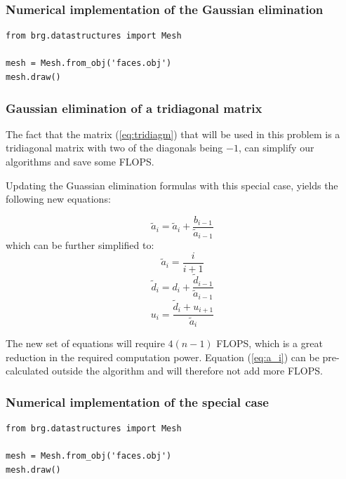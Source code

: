 \documentclass[12pt]{article}
\begin{document}
\subsubsection{Numerical implementation of the Gaussian elimination}

\lstset{language=Python}
\lstset{frame=lines}
\lstset{basicstyle=\footnotesize}
\begin{lstlisting}
from brg.datastructures import Mesh
 
mesh = Mesh.from_obj('faces.obj')
mesh.draw()
\end{lstlisting}

\subsubsection{Gaussian elimination of a tridiagonal matrix}
The fact that the matrix (\ref{eq:tridiagm}) that will be used in this problem is a tridiagonal matrix with two of the diagonals being $-1$, can simplify our algorithms and save some FLOPS.

Updating the Guassian elimination formulas with this special case, yields the following new equations:

\begin{equation}
\tilde{a}_{i}=\tilde{a}_{i}+\frac{b_{i-1}}{\tilde{a}_{i-1}}
\end{equation}
which can be further simplified to:
\begin{equation}
\tilde{a}_{i}=\frac{i}{i+1}
\label{eq:a_i}
\end{equation}
\begin{equation}
\tilde{d}_{i}=d_{i}+\frac{\tilde{d}_{i-1}}{\tilde{a}_{i-1}}
\end{equation}
\begin{equation}
u_{i}=\frac{\tilde{d}_{i}+u_{i+1}}{\tilde{a}_{i}}
\end{equation}

The new set of equations will require $4(n-1)$ FLOPS, which is a great reduction in the required computation power. Equation (\ref{eq:a_i}) can be pre-calculated outside the algorithm and will therefore not add more FLOPS.

\subsubsection{Numerical implementation of the special case}
\lstset{language=Python}
\lstset{frame=lines}
\lstset{basicstyle=\footnotesize}
\begin{lstlisting}
from brg.datastructures import Mesh
 
mesh = Mesh.from_obj('faces.obj')
mesh.draw()
\end{lstlisting}
\end{document}
